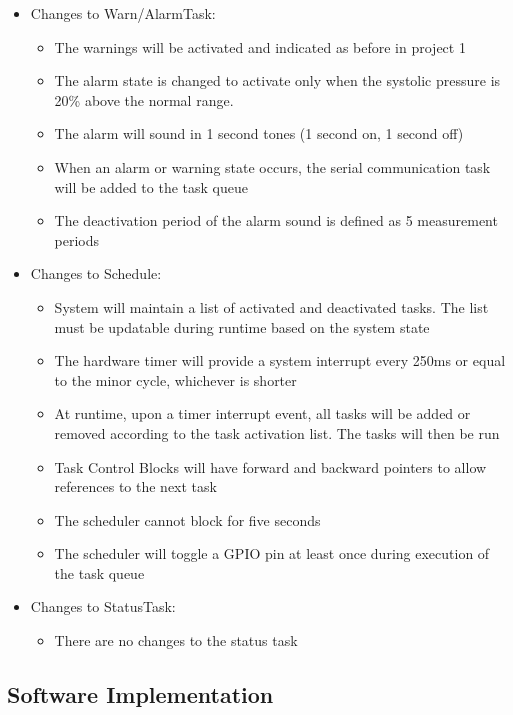 \documentclass[12pt]{article} %
\begin{document}
\begin{itemize}
  \item Changes to Warn/AlarmTask:
    \begin{itemize}
      \item The warnings will be activated and indicated as before in project 1
      \item The alarm state is changed to activate only when the systolic
	pressure is 20\% above the normal range.
      \item The alarm will sound in 1 second tones (1 second on, 1 second off)
      \item When an alarm or warning state occurs, the serial communication
	task will be added to the task queue
      \item The deactivation period of the alarm sound is defined as 5
	measurement periods
    \end{itemize}

  \item Changes to Schedule:
    \begin{itemize}
      \item System will maintain a list of activated and deactivated tasks. The
	list must be updatable during runtime based on the system state
      \item The hardware timer will provide a system interrupt every 250ms or
	equal to the minor cycle, whichever is shorter
      \item At runtime, upon a timer interrupt event, all tasks will be added
	or removed according to the task activation list. The tasks will then
	be run
      \item Task Control Blocks will have forward and backward pointers to
	allow references to the next task
      \item The scheduler cannot block for five seconds
      \item The scheduler will toggle a GPIO pin at least once during execution
	of the task queue 
    \end{itemize}

  \item Changes to StatusTask:
    \begin{itemize}
      \item There are no changes to the status task
    \end{itemize}
\end{itemize}

    \subsection{Software Implementation}
\end{document}
